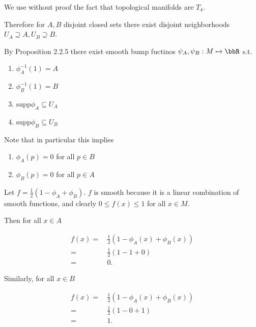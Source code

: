 We use without proof the fact that topological manifolds are $T_4$.

Therefore for $A, B$ disjoint closed sets there exist disjoint neighborhoods $U_A \supseteq A, U_B \supseteq B$.

By Proposition 2.2.5 there exist smooth bump fuctinos $\psi_A, \psi_B:M\mapsto\bbR$ s.t. 

\begin{enumerate}
\item $\phi_A^{-1}(1) = A$
\item $\phi_B^{-1}(1) = B$
\item $\textrm{supp} \phi_A \subseteq U_A$
\item $\textrm{supp} \phi_B \subseteq U_B$
\end{enumerate}

Note that in  particular this implies

\begin{enumerate}
\item $\phi_A(p) = 0$ for all $p \in B$
\item $\phi_B(p) = 0$ for all $p \in A$
\end{enumerate}


Let $f = \frac{1}{2}\left(1 - \phi_A + \phi_B\right)$.  $f$ is smooth because it is a linear combination of smooth functions, and clearly $0 \leq f(x) \leq 1$ for all $x \in M$.

Then for all $x \in A$

\begin{align*}
f(x) 
	= & \,
\frac{1}{2}\left(1 - \phi_A(x) + \phi_B(x)\right)
	\\
	= & \, 
\frac{1}{2}\left(1 -  1+ 0\right)
	\\
	= & \, 
0.
\end{align*}

Similarly, for all $x \in B$

\begin{align*}
f(x) 
	= & \,
\frac{1}{2}\left(1 - \phi_A(x) + \phi_B(x)\right)
	\\
	= & \, 
\frac{1}{2}\left(1 -  0+ 1\right)
	\\
	= & \, 
1.
\end{align*}
